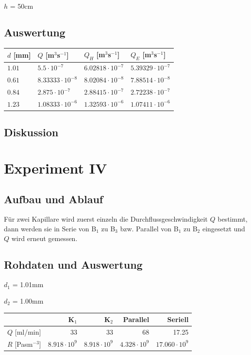 \documentclass[12pt,a4paper]{article}
\newcommand{\subscript}[1]{$_{#1}$}
\newcommand{\B}[1]{B\subscript{#1}}
\begin{document}
\vspace{5pt}
$h$ = 50cm

\subsection*{Auswertung}
\begin{tabular}{|l|l|l|l|}
\hline
$d$ [mm]&$Q$ [m$^3$s$^{-1}$]&$Q_H$ [m$^3$s$^{-1}$]&$Q_E$ [m$^3$s$^{-1}$]\\
\hline
$1.01$&$5.5\cdot 10^{-7}$&$6.02818\cdot 10^{-7}$&$5.39329\cdot 10^{-7}$\\
$0.61$&$8.33333\cdot 10^{-8}$&$8.02084\cdot 10^{-8}$&$7.88514\cdot 10^{-8}$\\
$0.84$&$2.875\cdot 10^{-7}$&$2.88415\cdot 10^{-7}$&$2.72238\cdot 10^{-7}$\\
$1.23$&$1.08333\cdot 10^{-6}$&$1.32593\cdot 10^{-6}$&$1.07411\cdot 10^{-6}$\\
\hline
\end{tabular}

\subsection*{Diskussion}


\section*{Experiment IV}

\subsection*{Aufbau und Ablauf}
F\"ur zwei Kapillare wird zuerst einzeln die Durchflussgeschwindigkeit $Q$ bestimmt, dann werden sie in Serie von \B{1} zu \B{3} bzw. Parallel von \B{1} zu \B{2} eingesetzt und $Q$ wird erneut gemessen.

\subsection*{Rohdaten und Auswertung}

$d_1$ = 1.01mm

$d_2$ = 1.00mm

\vspace{5pt}
\begin{tabular}{|l|r|r|r|r|}
\hline
&K\subscript{1}&K\subscript{2}&Parallel&Seriell\\
\hline
$Q$ [ml/min]&33&33&68&17.25\\
$R$ [Pasm$^{-3}$]&$8.918\cdot 10^9$&$8.918\cdot 10^9$&$4.328\cdot 10^9$&$17.060\cdot 10^9$\\
\hline
\end{tabular}
\end{document}
